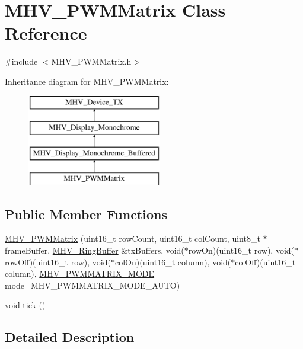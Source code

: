 \hypertarget{class_m_h_v___p_w_m_matrix}{
\section{\-M\-H\-V\-\_\-\-P\-W\-M\-Matrix \-Class \-Reference}
\label{class_m_h_v___p_w_m_matrix}
}


{\ttfamily \#include $<$\-M\-H\-V\-\_\-\-P\-W\-M\-Matrix.\-h$>$}

\-Inheritance diagram for \-M\-H\-V\-\_\-\-P\-W\-M\-Matrix\-:\begin{figure}[H]
\begin{center}
\leavevmode
\includegraphics[height=4.000000cm]{class_m_h_v___p_w_m_matrix}
\end{center}
\end{figure}
\subsection*{\-Public \-Member \-Functions}
\begin{DoxyCompactItemize}
\item 
\hyperlink{class_m_h_v___p_w_m_matrix_a3b522fc139f39df9e7de32954c12058d}{\-M\-H\-V\-\_\-\-P\-W\-M\-Matrix} (uint16\-\_\-t row\-Count, uint16\-\_\-t col\-Count, uint8\-\_\-t $\ast$frame\-Buffer, \hyperlink{class_m_h_v___ring_buffer}{\-M\-H\-V\-\_\-\-Ring\-Buffer} \&tx\-Buffers, void($\ast$row\-On)(uint16\-\_\-t row), void($\ast$row\-Off)(uint16\-\_\-t row), void($\ast$col\-On)(uint16\-\_\-t column), void($\ast$col\-Off)(uint16\-\_\-t column), \hyperlink{_m_h_v___p_w_m_matrix_8h_a6cc1d016b3af074f35a0248396cf6b73}{\-M\-H\-V\-\_\-\-P\-W\-M\-M\-A\-T\-R\-I\-X\-\_\-\-M\-O\-D\-E} mode=\-M\-H\-V\-\_\-\-P\-W\-M\-M\-A\-T\-R\-I\-X\-\_\-\-M\-O\-D\-E\-\_\-\-A\-U\-T\-O)
\item 
void \hyperlink{class_m_h_v___p_w_m_matrix_ae2f403a7f4f290f78752dfc4e85cde20}{tick} ()
\end{DoxyCompactItemize}


\subsection{\-Detailed \-Description}


